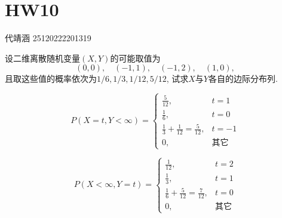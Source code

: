 \documentclass[../main.tex]{subfiles}
\begin{document}
\ifSubfilesClassLoaded{

    
    \setcounter{chapter}{9}
}{}

\chapter{ HW10 }
代靖涵 25120222201319

\begin{exercise}{}{}
设二维离散随机变量$(X,Y)$的可能取值为
\[
(0,0), \quad (-1,1), \quad (-1,2), \quad (1,0),
\]
且取这些值的概率依次为$1/6, 1/3, 1/12, 5/12$, 试求$X$与$Y$各自的边际分布列.
\end{exercise}
\begin{solution}
    

\[
P\left( X= t, Y< \infty \right)= \begin{cases} \frac{5 }{12 },&t= 1 
    \\\frac{1 }{6 },&t= 0 \\ 
 \frac{1 }{3 }+ \frac{1 }{12 }= \frac{5 }{12 },&t= -1  \\ 
  0,& \text{其它}    \end{cases}  
\]

\[
P\left( X< \infty,Y= t \right)= \begin{cases} \frac{1 }{12 },&t= 2\\ 
 \frac{1 }{3 },&t= 1\\ 
  \frac{1 }{6 }+ \frac{5 }{12 }= \frac{7 }{12 },&t= 0\\ 
   0,& \text{其它}      \end{cases}  
\]

\end{solution}
\end{document}
